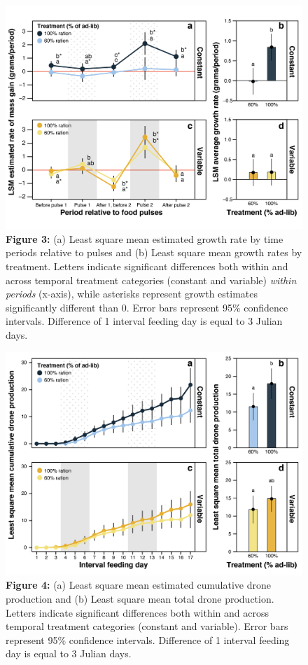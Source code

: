 \documentclass[11pt,]{article}
\begin{document}
\clearpage

\newpage

\begin{figure}
\centering
\includegraphics{./fig3_mc_growth.png}
\caption{\textbf{Figure 3:} (a) Least square mean estimated growth rate
by time periods relative to pulses and (b) Least square mean growth
rates by treatment. Letters indicate significant differences both within
and across temporal treatment categories (constant and variable)
\emph{within periods} (x-axis), while asterisks represent growth
estimates significantly different than 0. Error bars represent 95\%
confidence intervals. Difference of 1 interval feeding day is equal to 3
Julian days.}
\end{figure}

\clearpage

\newpage

\begin{figure}
\centering
\includegraphics{./fig4_drones.png}
\caption{\textbf{Figure 4:} (a) Least square mean estimated cumulative
drone production and (b) Least square mean total drone production.
Letters indicate significant differences both within and across temporal
treatment categories (constant and variable). Error bars represent 95\%
confidence intervals. Difference of 1 interval feeding day is equal to 3
Julian days.}
\end{figure}
\end{document}
